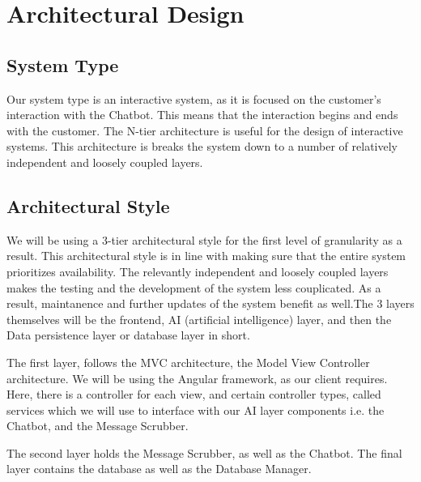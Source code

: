 \documentclass[11pt]{article}
\begin{document}
\section{Architectural Design}

\subsection{System Type}

Our system type is an interactive system, as it is focused on the customer's interaction with the Chatbot. This means that the interaction begins and ends with the customer. The N-tier architecture is useful for the design of interactive systems. This architecture is breaks the system down to a number of relatively independent and loosely coupled layers.\cite{Book:1}

\subsection{Architectural Style}

We will be using a 3-tier architectural style for the first level of granularity as a result. This architectural style is in line with making sure that the entire system prioritizes availability. The relevantly independent and loosely coupled layers makes the testing and the development of the system less couplicated. As a result, maintanence and further updates of the system benefit as well.The 3 layers themselves will be the frontend, AI (artificial intelligence) layer, and then the Data persistence layer or database layer in short.\par

The first layer, follows the MVC architecture, the Model View Controller architecture. We will be using the Angular framework, as our client requires. Here, there is a controller for each view, and certain controller types, called services which we will use to interface with our AI layer components i.e. the Chatbot, and the Message Scrubber.\par

The second layer holds the Message Scrubber, as well as the Chatbot. The final layer contains the database as well as the Database Manager.
\end{document}
